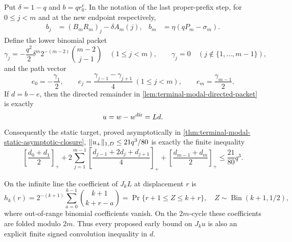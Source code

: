 \begin{lemma}
\label{lem:terminal-modal-static-remainder}
Put $\delta=1-q$ and $b=qr_0^v$.  In the notation of the last proper-prefix
step, for $0\le j<m$ and at the new endpoint respectively,
\begin{align}
 b_j&=(B_mR_m)_j-\delta A_m(j),
 &b_m&=\eta(qP_m-\sigma_m).
 \label{eq:terminal-modal-static-b}
\end{align}
Define the lower binomial packet
\begin{equation}
 \gamma_j=-\frac{q^2}{2}\delta^m2^{-(m-2)}
 \binom{m-2}{j-1}\quad(1\le j<m),
 \qquad \gamma_j=0\quad(j\notin\{1,\ldots,m-1\}),
 \label{eq:terminal-modal-lower-packet}
\end{equation}
and the path vector
\begin{equation}
 e_0=-\frac{\gamma_1}{2},\qquad
 e_j=\frac{\gamma_{j-1}-\gamma_{j+1}}4\ (1\le j<m),
 \qquad e_m=\frac{\gamma_{m-1}}2.
 \label{eq:terminal-modal-directed-deconvolution}
\end{equation}
If $d=b-e$, then the directed remainder in
\cref{lem:terminal-modal-directed-packet} is exactly
\begin{equation}
 u=w-w^{\rm dir}=Ld.
 \label{eq:terminal-modal-static-remainder}
\end{equation}
Consequently the static target, proved asymptotically in
\cref{thm:terminal-modal-static-asymptotic-closure},
$\lVert u_+\rVert_{1,D}\le21q^3/80$ is exactly the finite inequality
\begin{equation}
 \left[\frac{d_0+d_1}{2}\right]_+
 +2\sum_{j=1}^{m-1}
 \left[\frac{d_{j-1}+2d_j+d_{j+1}}4\right]_+
 +\left[\frac{d_{m-1}+d_m}{2}\right]_+
 \le\frac{21}{80}q^3.
 \label{eq:terminal-modal-static-finite-target}
\end{equation}

On the infinite line the coefficient of $J_kL$ at displacement $r$ is
\begin{equation}
 h_k(r)=2^{-(k+1)}\sum_{a=0}^{k-1}
 \binom{k+1}{k+r-a}
 =\Pr\{r+1\le Z\le k+r\},
 \quad Z\sim\operatorname{Bin}(k+1,1/2),
 \label{eq:terminal-modal-JL-kernel}
\end{equation}
where out-of-range binomial coefficients vanish.  On the $2m$-cycle these
coefficients are folded modulo $2m$.  Thus every proposed early bound on
$J_ku$ is also an explicit finite signed convolution inequality in $d$.
\end{lemma}

